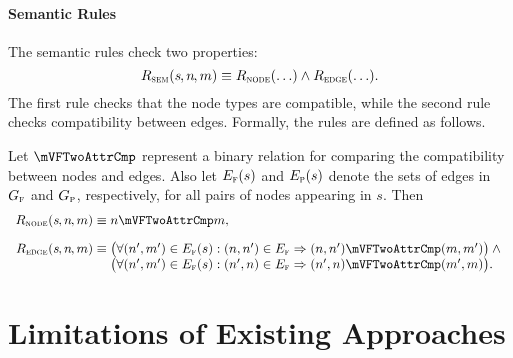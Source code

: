 \paragraph{Semantic Rules}

\def\mSemNodeRule{R_{\mathsc{node}}}
\def\mSemEdgeRule{R_{\mathsc{edge}}}

The semantic rules check two properties:
%
\begin{equation}
  \mSemRuleCheck(s\hspace{-.8pt}, n\hspace{-.8pt}, m) \equiv
  \mSemNodeRule(\ldots) \mAnd \mSemEdgeRule(\ldots).
\end{equation}
%
The first rule checks that the \gls{node} types are compatible, while the second
rule checks compatibility between \glspl{edge}.
%
Formally, the rules are defined as follows.
%
\begin{definition}
  Let $\mVFTwoAttrCmp$ represent a binary relation for comparing the
  compatibility between \glspl{node} and \glspl{edge}.
  Also let $E_{\textrm{\textsc{f}}}(s)$ and $E_{\textrm{\textsc{p}}}(s)$ denote the sets of \glspl{edge} in $G_{\textrm{\textsc{f}}}$ and
  $G_{\textrm{\textsc{p}}}$, respectively, for all pairs of \glspl{node} appearing in
  $s$\hspace{-.8pt}.
  Then
  \begin{displaymath}
    \begin{array}{r@{}l}
        \mSemNodeRule(s\hspace{-.8pt}, n\hspace{-.8pt}, m) \equiv \mbox{}
      & n \mVFTwoAttrCmp m, \\[\abovedisplayskip]
        \mSemEdgeRule(s\hspace{-.8pt}, n\hspace{-.8pt}, m) \equiv \mbox{}
      & \big(
        \forall \mPair{n'}{m'} \in \fE(s) :
        \mPair{n}{n'} \in \fE \mImp \mPair{n}{n'} \mVFTwoAttrCmp \mPair{m}{m'}
        \big) \mAnd \mbox{} \\
      & \big(
        \forall \mPair{n'}{m'} \in \fE(s) :
        \mPair{n'}{n} \in \fE \mImp \mPair{n'}{n} \mVFTwoAttrCmp \mPair{m'}{m}
        \big).
    \end{array}
  \end{displaymath}%
\end{definition}


\section{Limitations of Existing Approaches}

